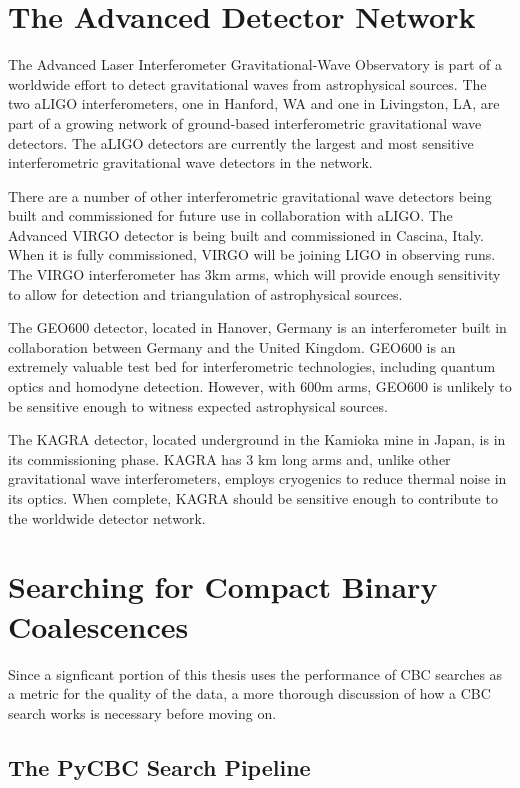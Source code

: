 \section{The Advanced Detector Network}

The Advanced Laser Interferometer Gravitational-Wave Observatory is 
part of a worldwide effort to detect gravitational waves from astrophysical 
sources. The two aLIGO interferometers, one in Hanford, WA and one in 
Livingston, LA, are part of a growing network of ground-based interferometric 
gravitational wave detectors. The aLIGO detectors are currently the largest 
and most sensitive interferometric gravitational wave detectors in the 
network.

There are a number of other interferometric gravitational wave detectors 
being built and commissioned for future use in collaboration with aLIGO.
The Advanced VIRGO detector is being built and commissioned in Cascina, Italy. 
When it is fully commissioned, VIRGO will be joining LIGO in observing runs. 
The VIRGO interferometer has 3km arms, which will provide enough 
sensitivity to allow for detection and triangulation of astrophysical sources.

The GEO600 detector, located in Hanover, Germany is an interferometer built in 
collaboration between Germany and the United Kingdom. 
GEO600 is an extremely valuable test bed for interferometric technologies,
including quantum optics and homodyne detection. However, with 600m arms, GEO600 
is unlikely to be sensitive enough to witness expected astrophysical sources.

The KAGRA detector, located underground in the Kamioka mine in Japan, 
is in its commissioning phase. KAGRA has 3 km long arms and, 
unlike other gravitational wave interferometers, employs cryogenics to 
reduce thermal noise in its optics. When complete, KAGRA should be 
sensitive enough to contribute to the worldwide detector network.

\section{Searching for Compact Binary Coalescences}\label{sec:cbc-search}

Since a signficant portion of this thesis uses the performance of 
CBC searches as a metric for the quality of the 
data, a more thorough discussion of how a CBC search 
works is necessary before moving on. 

\subsection{The PyCBC Search Pipeline}

